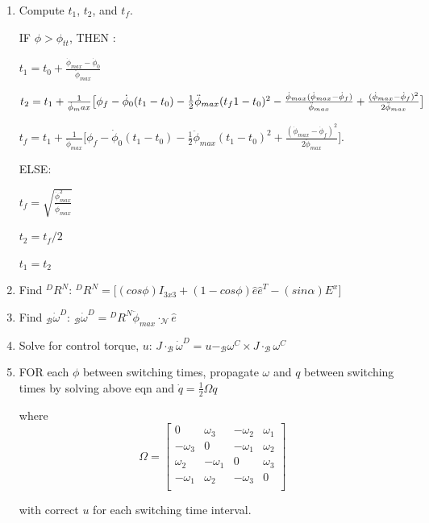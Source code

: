 \documentclass[letterpaper, preprint, paper,11pt]{AAS}	%
\begin{document}
\begin{enumerate}
\begin{enumerate}
			\item Compute $t_1$, $t_2$, and $t_f$. 
			
			IF $\phi > \phi_{tt}$, THEN : 
			
			$
			t_1 = t_0 + \frac{\dot{\phi}_{max} - \dot{\phi}_0}{\ddot{\phi}_{max}}
			$ 
			
			$
			t_2 = t_1 + \frac{1}{\dot{\phi}_max} \big[ \phi_f - \dot{\phi}_0 (t_1 - t_0) - \frac{1}{2} \ddot{\phi}_{max} (t_f1 - t_0)^2 - \\ \frac{\dot{\phi}_{max} ( \dot{\phi}_{max} -  \dot{\phi}_f ) }{\ddot{\phi}_{max}} + \frac{ (\dot{\phi}_{max} - \dot{\phi}_f)^2}{2 \ddot{\phi}_{max}} \big]
			$
			
			$
			t_f=t_1+\frac{1}{\dot{\phi}_{max}}\Big[ \phi_f-\dot{\phi}_0(t_1-t_0)-\frac{1}{2}\ddot{\phi}_{max}(t_1-t_0)^2+\frac{(\dot{\phi}_{max}-\dot{\phi}_f)^2}{2\ddot{\phi}_{max}} \Big].
			$
			
			ELSE: 
			
			$ t_f = \sqrt{\frac{\dot{\phi}_{max}^2}{\ddot{\phi}_{max}}}
			$
			
			$ t_2 = t_f / 2 $ 
			
			$ t_1 = t_2 $ 
			
			\item Find ${}^DR^N$: 
			$
			{}^DR^N = \big[(cos\phi)I_{3x3} + (1 - cos\phi)\hat{e}\hat{e}^T - (sin\alpha)E^x \big]
			$
			
			\item Find $_\mathcal{B}\dot{\omega}^{D}$: 
			$
			_\mathcal{B}\dot{\omega}^{D} = {}^DR^N \ddot{\phi}_{max} \cdot _\mathcal{N}\hat{e}
			$
			
			\item Solve for control torque, $u$: 
			$
			J \cdot _\mathcal{B}\dot{\omega}^D = u - _\mathcal{B}\omega^C \times J \cdot _\mathcal{B}\omega^C 
			$
			
			\item FOR each $\phi$ between switching times, propagate $\omega$ and $q$ between switching times by solving above eqn and 
			$
			\dot{q} = \frac{1}{2} \Omega q 
			$
			
			where
			\[ \Omega = \left[ \begin{array}{cccc}
			0 & \omega_3 & -\omega_2 & \omega_1 \\
			-\omega_3 & 0 & -\omega_1 & \omega_2 \\
			\omega_2 & -\omega_1 & 0 & \omega_3 \\ 
			-\omega_1 & \omega_2 & -\omega_3 & 0 \\ 
			\end{array} \right] \] 
			
			with correct $u$ for each switching time interval. 
			
		\end{enumerate} 
	\end{enumerate}
	
\end{document}
